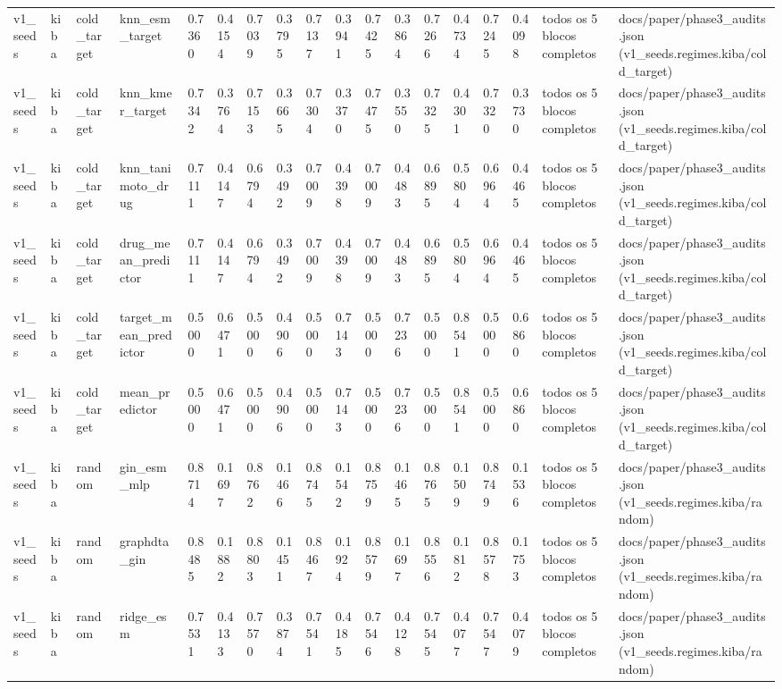 \begin{table}[htbp]
\begin{tabular}{llllllllllllllllll}
v1\_seeds & kiba & cold\_target & knn\_esm\_target & 0.7360 & 0.4154 & 0.7039 & 0.3795 & 0.7137 & 0.3941 & 0.7425 & 0.3864 & 0.7266 & 0.4734 & 0.7245 & 0.4098 & todos os 5 blocos completos & docs/paper/phase3\_audits.json (v1\_seeds.regimes.kiba/cold\_target) \\
v1\_seeds & kiba & cold\_target & knn\_kmer\_target & 0.7342 & 0.3764 & 0.7153 & 0.3665 & 0.7304 & 0.3370 & 0.7475 & 0.3550 & 0.7325 & 0.4301 & 0.7320 & 0.3730 & todos os 5 blocos completos & docs/paper/phase3\_audits.json (v1\_seeds.regimes.kiba/cold\_target) \\
v1\_seeds & kiba & cold\_target & knn\_tanimoto\_drug & 0.7111 & 0.4147 & 0.6794 & 0.3492 & 0.7009 & 0.4398 & 0.7009 & 0.4483 & 0.6895 & 0.5804 & 0.6964 & 0.4465 & todos os 5 blocos completos & docs/paper/phase3\_audits.json (v1\_seeds.regimes.kiba/cold\_target) \\
v1\_seeds & kiba & cold\_target & drug\_mean\_predictor & 0.7111 & 0.4147 & 0.6794 & 0.3492 & 0.7009 & 0.4398 & 0.7009 & 0.4483 & 0.6895 & 0.5804 & 0.6964 & 0.4465 & todos os 5 blocos completos & docs/paper/phase3\_audits.json (v1\_seeds.regimes.kiba/cold\_target) \\
v1\_seeds & kiba & cold\_target & target\_mean\_predictor & 0.5000 & 0.6471 & 0.5000 & 0.4906 & 0.5000 & 0.7143 & 0.5000 & 0.7236 & 0.5000 & 0.8541 & 0.5000 & 0.6860 & todos os 5 blocos completos & docs/paper/phase3\_audits.json (v1\_seeds.regimes.kiba/cold\_target) \\
v1\_seeds & kiba & cold\_target & mean\_predictor & 0.5000 & 0.6471 & 0.5000 & 0.4906 & 0.5000 & 0.7143 & 0.5000 & 0.7236 & 0.5000 & 0.8541 & 0.5000 & 0.6860 & todos os 5 blocos completos & docs/paper/phase3\_audits.json (v1\_seeds.regimes.kiba/cold\_target) \\
v1\_seeds & kiba & random & gin\_esm\_mlp & 0.8714 & 0.1697 & 0.8762 & 0.1466 & 0.8745 & 0.1542 & 0.8759 & 0.1465 & 0.8765 & 0.1509 & 0.8749 & 0.1536 & todos os 5 blocos completos & docs/paper/phase3\_audits.json (v1\_seeds.regimes.kiba/random) \\
v1\_seeds & kiba & random & graphdta\_gin & 0.8485 & 0.1882 & 0.8803 & 0.1451 & 0.8467 & 0.1924 & 0.8579 & 0.1697 & 0.8556 & 0.1812 & 0.8578 & 0.1753 & todos os 5 blocos completos & docs/paper/phase3\_audits.json (v1\_seeds.regimes.kiba/random) \\
v1\_seeds & kiba & random & ridge\_esm & 0.7531 & 0.4133 & 0.7570 & 0.3874 & 0.7541 & 0.4185 & 0.7546 & 0.4128 & 0.7545 & 0.4077 & 0.7547 & 0.4079 & todos os 5 blocos completos & docs/paper/phase3\_audits.json (v1\_seeds.regimes.kiba/random) \\

\end{tabular}
\end{table}
